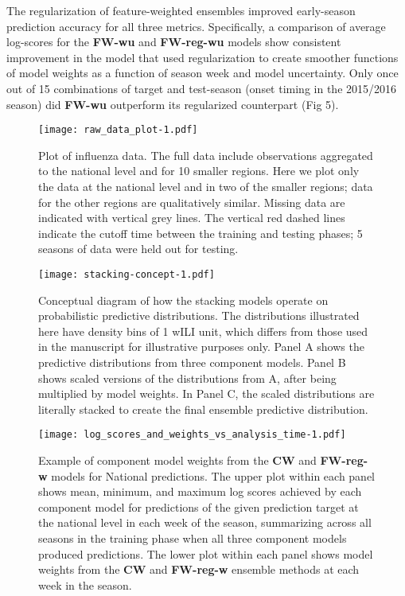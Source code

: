 \documentclass[10pt,letterpaper]{article}
\begin{document}
The regularization of feature-weighted ensembles improved early-season
prediction accuracy for all three metrics. Specifically, a comparison of
average log-scores for the \textbf{FW-wu} and \textbf{FW-reg-wu} models
show consistent improvement in the model that used regularization to
create smoother functions of model weights as a function of season week
and model uncertainty. Only once out of 15 combinations of target and
test-season (onset timing in the 2015/2016 season) did \textbf{FW-wu}
outperform its regularized counterpart (Fig 5).

\begin{figure}[htbp]
\centering
\texttt{[image: raw\_data\_plot-1.pdf]}
\caption{\label{fig:raw-data}Plot of influenza data. The full data
include observations aggregated to the national level and for 10 smaller
regions. Here we plot only the data at the national level and in two of
the smaller regions; data for the other regions are qualitatively
similar. Missing data are indicated with vertical grey lines. The
vertical red dashed lines indicate the cutoff time between the training
and testing phases; 5 seasons of data were held out for testing.}
\end{figure}

\begin{figure}[htbp]
\centering
\texttt{[image: stacking-concept-1.pdf]}
\caption{\label{fig:stacking-concept}Conceptual diagram of how the
stacking models operate on probabilistic predictive distributions. The
distributions illustrated here have density bins of 1 wILI unit, which
differs from those used in the manuscript for illustrative purposes
only. Panel A shows the predictive distributions from three component
models. Panel B shows scaled versions of the distributions from A, after
being multiplied by model weights. In Panel C, the scaled distributions
are literally stacked to create the final ensemble predictive
distribution.}
\end{figure}

\begin{figure}[htbp]
\centering
\texttt{[image: log\_scores\_and\_weights\_vs\_analysis\_time-1.pdf]}
\caption{\label{fig:example-weights}Example of component model weights
from the \textbf{CW} and \textbf{FW-reg-w} models for National
predictions. The upper plot within each panel shows mean, minimum, and
maximum log scores achieved by each component model for predictions of
the given prediction target at the national level in each week of the
season, summarizing across all seasons in the training phase when all
three component models produced predictions. The lower plot within each
panel shows model weights from the \textbf{CW} and \textbf{FW-reg-w}
ensemble methods at each week in the season.}
\end{figure}
\end{document}
